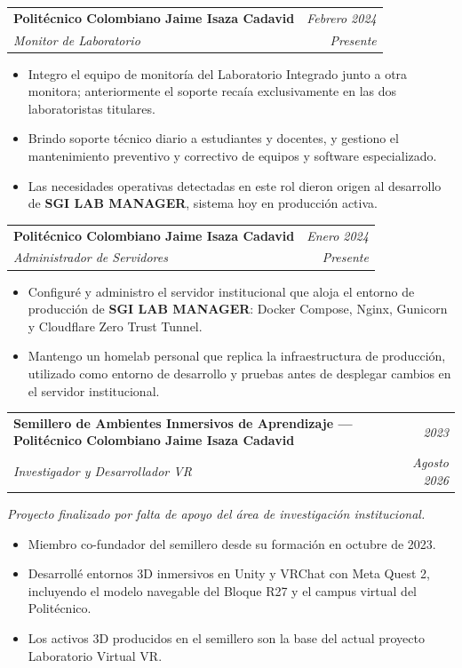 \documentclass[11pt, a4paper]{article}
\makeatletter
\newcommand{\expentry}[4]{%
  \noindent
  \begin{tabularx}{\textwidth}{@{}X r@{}}
    \textbf{\color{primary}#1} & \textit{\small\color{darkgray}#3} \\
    \textit{\color{accent}#2}  & \textit{\small\color{darkgray}#4} \\
  \end{tabularx}%
}
\makeatother
\begin{document}
\vspace{6pt}
\expentry{Politécnico Colombiano Jaime Isaza Cadavid}{Monitor de Laboratorio}{Febrero 2024}{Presente}

\begin{itemize}
  \item Integro el equipo de monitoría del Laboratorio Integrado junto a otra monitora;
        anteriormente el soporte recaía exclusivamente en las dos laboratoristas titulares.
  \item Brindo soporte técnico diario a estudiantes y docentes, y gestiono el mantenimiento
        preventivo y correctivo de equipos y software especializado.
  \item Las necesidades operativas detectadas en este rol dieron origen al desarrollo de
        \textbf{SGI LAB MANAGER}, sistema hoy en producción activa.
\end{itemize}

\vspace{6pt}
\expentry{Politécnico Colombiano Jaime Isaza Cadavid}{Administrador de Servidores}{Enero 2024}{Presente}

\begin{itemize}
  \item Configuré y administro el servidor institucional que aloja el entorno de
        producción de \textbf{SGI LAB MANAGER}: Docker Compose, Nginx, Gunicorn y
        Cloudflare Zero Trust Tunnel.
  \item Mantengo un homelab personal que replica la infraestructura de producción,
        utilizado como entorno de desarrollo y pruebas antes de desplegar cambios
        en el servidor institucional.
\end{itemize}

\vspace{6pt}
\expentry{Semillero de Ambientes Inmersivos de Aprendizaje — Politécnico Colombiano Jaime Isaza Cadavid}{Investigador y Desarrollador VR}{2023}{Agosto 2026}

\textit{\small\color{darkgray}Proyecto finalizado por falta de apoyo del área de investigación institucional.}

\begin{itemize}
  \item Miembro co-fundador del semillero desde su formación en octubre de 2023.
  \item Desarrollé entornos 3D inmersivos en Unity y VRChat con Meta Quest 2,
        incluyendo el modelo navegable del Bloque R27 y el campus virtual del Politécnico.
  \item Los activos 3D producidos en el semillero son la base del actual proyecto
        Laboratorio Virtual VR.
\end{itemize}
\end{document}
